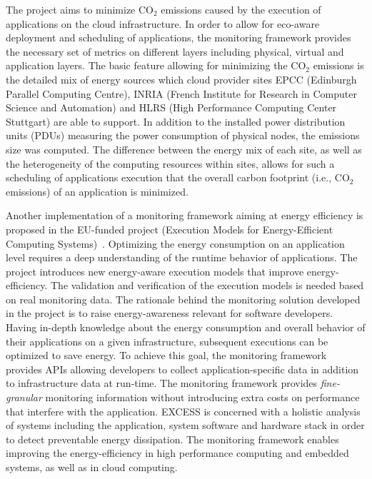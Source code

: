 \documentclass[10pt,letterpaper]{IEEEtran}
\begin{document}
The \ECO project aims to minimize $\mathrm{CO_2}$ emissions caused by the execution of applications on the cloud
infrastructure. In order to allow for eco-aware deployment and scheduling of applications,
the \ECO monitoring framework provides the necessary set of metrics on different layers including physical,
virtual and application layers. The basic feature allowing for minimizing the
$\mathrm{CO_2}$ emissions is the detailed mix of energy sources which cloud provider sites
EPCC (Edinburgh Parallel Computing Centre), INRIA (French Institute for Research in
Computer Science and Automation) and HLRS (High Performance Computing Center Stuttgart)
are able to support. In addition to the installed power distribution units (PDUs) measuring
the power consumption of physical nodes, the emissions size was computed.
The difference between the energy mix of each site, as well as the
heterogeneity of the computing resources within sites, allows for such
a scheduling of applications execution that the overall carbon footprint (i.e., $\mathrm{CO_2}$ emissions)
of an application is minimized.

Another implementation of a monitoring framework aiming at energy efficiency
is proposed in the EU-funded project \EXCESS (Execution Models
for Energy-Efficient Computing Systems)~\cite{koller14}.
Optimizing the energy consumption on an application level requires a deep understanding of the runtime behavior of applications.
The \EXCESS project introduces new energy-aware execution models that improve energy-efficiency.
The validation and verification of the execution models is needed based on real monitoring data.
The rationale behind the monitoring solution developed in the \EXCESS project is to
raise energy-awareness relevant for software developers. Having in-depth
knowledge about the energy consumption and overall behavior of their applications on a given infrastructure,
subsequent executions can be optimized to save energy. To achieve this goal, the \EXCESS monitoring framework
provides APIs allowing developers to collect application-specific data in addition to infrastructure data at run-time.
The \EXCESS monitoring framework provides \emph{fine-granular} monitoring information
without introducing extra costs on performance that interfere with the application.
EXCESS is concerned with a holistic analysis of systems including the application,
system software and hardware stack in order to detect preventable energy dissipation.
The \EXCESS monitoring framework enables improving the energy-efficiency in high performance computing
and embedded systems, as well as in cloud computing.
\end{document}
